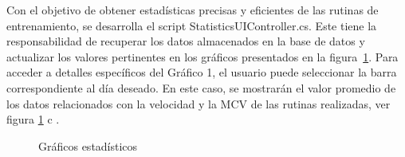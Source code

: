 Con el objetivo de obtener estadísticas precisas y eficientes de las rutinas de entrenamiento, se desarrolla el script StatisticsUIController.cs. Este tiene la responsabilidad de recuperar los datos almacenados en la base de datos y actualizar los valores pertinentes en los gráficos presentados en la figura~\ref{fig: statics-graphs}. Para acceder a detalles específicos del Gráfico 1, el usuario puede seleccionar la barra correspondiente al día deseado. En este caso, se mostrarán el valor promedio de los datos relacionados con la velocidad y la MCV de las rutinas realizadas, ver figura \ref{fig: statics-graphs} c  .

\begin{figure}[ht]
    \centering

    \caption{Gráficos estadísticos}
    \label{fig: statics-graphs}
\end{figure}

